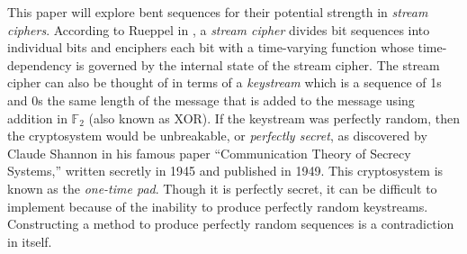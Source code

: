 \documentclass[english]{article}
\def\gftwo{\mathbb{F}_2}
\theoremstyle{plain}
\theoremstyle{definition}
\theoremstyle{remark}
\begin{document}
\par This paper will explore bent sequences for their potential strength in
{\it stream ciphers}. According to Rueppel in \cite{bk:r86}, a {\em stream cipher}
divides bit sequences into individual bits and enciphers each bit with a
time-varying function whose time-dependency is governed by the internal state
of the stream cipher.  The stream cipher can also be thought of in terms of a
{\em keystream} which is a sequence of 1s and 0s the same length of the
message that is added to the message using addition in $\gftwo$ (also known
as XOR). If the keystream was perfectly random, then the cryptosystem would
be unbreakable, or {\em perfectly secret}, as discovered by Claude Shannon
in his famous paper ``Communication Theory of Secrecy Systems,'' written
secretly in 1945 and published in 1949. This cryptosystem is known as the
{\em one-time pad}. Though it is perfectly secret, it can be difficult to
implement because of the inability to produce perfectly random keystreams.
Constructing a method to produce perfectly random sequences is a
contradiction in itself.
\end{document}
